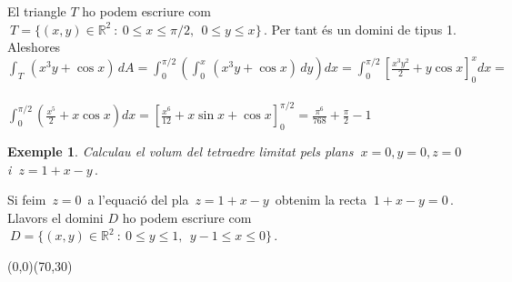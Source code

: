 \documentclass[12pt]{article}
\newtheorem{exemple}{Exemple}[subsection]
\newcommand{\R}{\mathbb{R}}
\begin{document}


El triangle $T$ ho podem escriure com $\ T=\{(x,y)\in\R^2\ :\ 0\leq
x\leq \pi/2,\ \ 0\leq y\leq x\}\,.$ Per tant {\'e}s un domini de tipus
1. Aleshores\\

\hspace*{1cm}$\displaystyle\int_T\,(x^3y+\cos x)\,dA=
\int_0^{\pi/2}\left(\int_{0}^{x}\,(x^3y+\cos x)\,
dy\right)dx=\int_0^{\pi/2}\left[\frac{x^3 y^2}{2}+ y\cos
x\right]_0^xdx=$\\\\

\hspace*{1cm}$\displaystyle\int_0^{\pi/2}\left(\frac{x^5}{2}+ x\cos
x\right)dx=\left[\frac{x^6}{12}+ x\sin x+\cos
x\right]_0^{\pi/2}=\frac{\pi^6}{768}+\frac{\pi}{2}-1$\\


\begin{exemple}
Calculau el volum del tetraedre limitat pels plans $\ x=0,y=0,z=0\ $
i $\ z=1+x-y\,.$
\end{exemple}

Si feim $\,z=0\,$ a l'equaci{\'o} del pla $\, z=1+x-y\,$ obtenim la
recta $\ 1+x-y=0\,.$ Llavors el domini $D$ ho podem escriure com $\
D=\{(x,y)\in\R^2\ :\ 0\leq y\leq 1,\ \ y-1\leq x\leq 0\}\,.$

\vspace*{2.cm}
\begin{center}
\begin{picture}(0,0)(70,30)
\end{picture}
\end{center}
\end{document}
